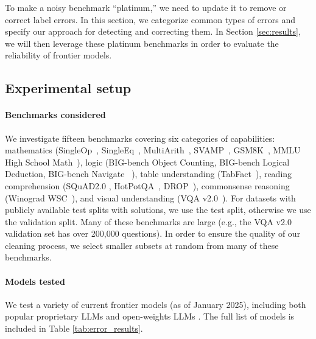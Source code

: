 

To make a noisy benchmark ``platinum,'' we need to update it to remove or correct label errors. In this section, we categorize common types of errors and specify our approach for detecting and correcting them. In Section \ref{sec:results}, we will then leverage these platinum benchmarks in order to evaluate the reliability of frontier models.


\subsection{Experimental setup}

\paragraph{Benchmarks considered} We investigate fifteen benchmarks covering six categories of capabilities: mathematics (SingleOp~\cite{roy2015reasoning}, SingleEq~\cite{koncel2015parsing}, MultiArith~\cite{roy2016solving}, SVAMP~\citep{patel2021nlp}, GSM8K~\citep{cobbe2021training}, MMLU High School Math~\citep{hendrycks2020measuring}), logic (BIG-bench Object Counting, BIG-bench Logical Deduction, BIG-bench Navigate ~\citep{srivastava2022beyond, suzgun2022challenging}), table understanding (TabFact~\citep{chen2019tabfact}), reading comprehension (SQuAD2.0 \cite{rajpurkar2018know}, HotPotQA~\citep{yang2018hotpotqa}, DROP~\citep{dua2019drop}), commonsense reasoning (Winograd WSC~\citep{levesque2012winograd}), and visual understanding (VQA v2.0~\citep{goyal2017making}). For datasets with publicly available test splits with solutions, we use the test split, otherwise we use the validation split. Many of these benchmarks are large (e.g., the VQA v2.0 validation set has over 200,000 questions). In order to ensure the quality of our cleaning process, we select smaller subsets at random from many of these benchmarks.

\paragraph{Models tested}
We test a variety of current frontier models (as of January 2025), including both popular proprietary LLMs \cite{openai2023gpt4,Claude35ModelCardAddendum,reid2024gemini,openai2024o1,openai2025o3mini} and open-weights LLMs \cite{dubey2024llama,qwen2.5,deepseekai2024deepseekv3technicalreport,guo2025deepseek}. The full list of models is included in Table \ref{tab:error_results}.


